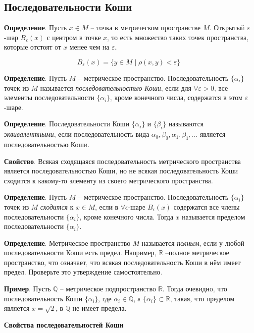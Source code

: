 \documentclass[a4paper]{book}
\begin{document}
\subsection{Последовательности Коши} 
\textbf{Определение}. Пусть $x\in M$ -- точка в метрическом пространстве $M$. Открытый $\varepsilon$-шар $B_{\varepsilon}(x)$ с центром в точке $x$, то есть множество таких точек пространства, которые отстоят от $x$ менее чем на $\varepsilon$. 

\begin{equation}
B_{\varepsilon}(x)=\{y\in M\mid \rho(x,y) < \varepsilon\}
\end{equation}

\textbf{Определение}. Пусть $M$ -- метрическое пространство. Последовательность $\{\alpha_i\}$ точек из $M$ называется \textit{последовательностью Коши}, если для $\forall \varepsilon > 0$, все элементы последовательности $\{\alpha_i\}$, кроме конечного числа, содержатся в этом $\varepsilon$-шаре. 

\textbf{Определение}. Последовательности Коши $\{\alpha_i\}$ и $\{\beta_i\}$ называются \textit{эквивалентными}, если последовательность вида $\alpha_0, \beta_0, \alpha_1, \beta_1,...$ является последовательностью Коши. 

\textbf{Свойство}. Всякая сходящаяся последовательность метрического пространства является последовательностью Коши, но не всякая последовательность Коши сходится к какому-то элементу из своего метрического пространства. 

\textbf{Определение}. Пусть $M$ -- метрическое пространство. Последовательность $\{\alpha_i\}$ точек из $M$ \textit{сходится} к $x\in M$, если в $\forall\epsilon$-шаре $B_{\epsilon}(x)$ содержатся все члены последовательности $\{\alpha_i\}$, кроме конечного числа. Тогда $x$ называется пределом последовательности $\{\alpha_i\}$. 

\textbf{Определение}. Метрическое пространство $M$ называется \textit{полным}, если у любой последовательности Коши есть предел. Например, $\mathbb{R}$ --полное метрическое пространство, что означает, что всякая последовательность Коши в нём имеет предел. Проверьте это утверждение самостоятельно. 

\textbf{Пример}. Пусть $\mathbb{Q}$ -- метрическое подпространство $\mathbb{R}$. Тогда очевидно, что последовательность Коши $\{\alpha_i\}$, где $\alpha_i\in\mathbb{Q}$, а $\{\alpha_i\} \subset \mathbb{R}$, такая, что пределом является $x=\sqrt{2}$,  в $\mathbb{Q}$ не имеет предела. 

\textbf{Свойства последовательностей Коши}
\end{document}
